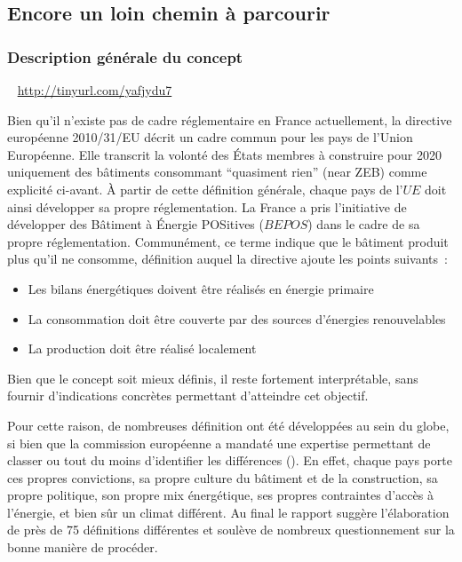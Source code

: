 



\subsection{Encore un loin chemin à parcourir} %
\label{sub:encore_un_loin_chemin__parcourir}


\subsubsection{Description générale du concept} %
\label{ssub:description_generale_du_concept}
~
\href{Further development of EU energy efficiency policies}{http://tinyurl.com/yafjydu7}


Bien qu’il n’existe pas de cadre réglementaire en France actuellement,
la directive européenne 2010/31/EU décrit un cadre commun pour les pays
de l’Union Européenne. Elle transcrit la volonté des États membres à construire pour 2020
uniquement des bâtiments consommant \enquote{quasiment rien} (near ZEB) comme explicité ci-avant.
À partir de cette définition générale, chaque pays de l’$UE$ doit ainsi développer sa
propre réglementation. La France a pris l’initiative de développer des Bâtiment à
Énergie POSitives ($BEPOS$) dans le cadre de sa propre réglementation. Communément,
ce terme indique que le bâtiment produit plus qu’il ne consomme, définition
auquel la directive ajoute les points suivants~:
\begin{itemize}
    \item Les bilans énergétiques doivent être réalisés en énergie primaire
    \item La consommation doit être couverte par des sources d’énergies renouvelables
    \item La production doit être réalisé localement
\end{itemize}
Bien que le concept soit mieux définis, il reste fortement interprétable,
sans fournir d’indications concrètes permettant d’atteindre cet objectif.

Pour cette raison, de nombreuses définition ont été développées au sein du globe,
si bien que la commission européenne a mandaté une expertise permettant de classer ou
tout du moins d’identifier les différences ().
En effet, chaque pays porte ces propres
convictions, sa propre culture du bâtiment et de la construction, sa propre politique,
son propre mix énergétique, ses propres contraintes d’accès à l’énergie, et bien sûr
un climat différent.
Au final le rapport suggère l’élaboration de près de 75 définitions différentes
et soulève de nombreux questionnement sur la bonne manière de procéder.

